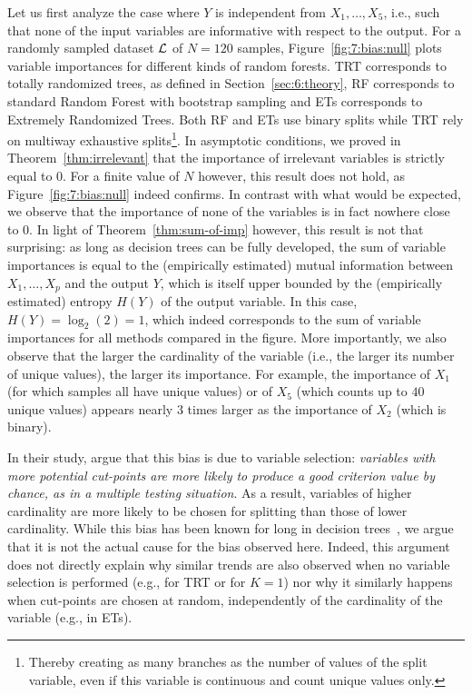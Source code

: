 Let us first analyze the case where $Y$ is independent from $X_1, \dots, X_5$,
i.e., such that none of the input variables are informative with respect to the
output. For a randomly sampled dataset ${\cal L}$ of $N=120$ samples,
Figure~\ref{fig:7:bias:null} plots variable importances for different kinds of
random forests. TRT corresponds to totally randomized trees, as defined in
Section~\ref{sec:6:theory}, RF corresponds to standard Random Forest with
bootstrap sampling and ETs corresponds to Extremely Randomized Trees. Both RF
and ETs use binary splits while TRT rely on multiway exhaustive
splits\footnote{Thereby creating as many branches as the number of values of
the split variable, even if this variable is continuous and count unique values
only.}. In asymptotic conditions, we proved in Theorem~\ref{thm:irrelevant}
that the importance of irrelevant variables is strictly equal to $0$. For a
finite value of $N$ however, this result does not hold, as
Figure~\ref{fig:7:bias:null} indeed confirms. In contrast with what would be
expected, we observe that the importance of none of the variables is in fact
nowhere close to $0$. In light of Theorem~\ref{thm:sum-of-imp} however, this
result is not that surprising: as long as decision trees can be fully
developed, the sum of variable importances is equal to  the (empirically
estimated) mutual information between $X_1,\dots,X_p$ and the output $Y$, which
is itself upper bounded by the (empirically estimated) entropy $H(Y)$ of the
output variable. In this case, $H(Y)=\log_2(2)=1$, which indeed corresponds to
the sum of variable importances for all methods compared in the figure. More
importantly, we also observe that the larger the cardinality of the variable
(i.e., the larger its number of unique values), the larger its importance. For
example, the importance of $X_1$ (for which samples all have unique values) or
of $X_5$ (which counts up to $40$ unique values) appears nearly $3$ times
larger as the importance of $X_2$ (which is binary).

In their study, \citet{strobl:2007b} argue that this bias is due to variable
selection: \textit{variables with more potential cut-points are more likely to
produce a good criterion value by chance, as in a multiple testing situation}.
As a result, variables of higher cardinality are more likely to be chosen for
splitting than those of lower cardinality. While this bias has been known for
long in decision trees~\citep{kononenko:1995,kim:2001,hothorn:2006}, we argue
that it is not the actual cause for the bias observed here. Indeed, this
argument does not directly explain why similar trends are also observed when no
variable selection is performed (e.g., for TRT or for $K=1$) nor why it
similarly happens when cut-points are chosen at random, independently of the
cardinality of the variable (e.g., in ETs).

